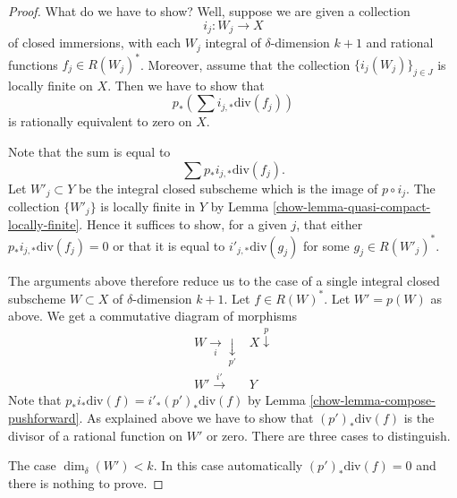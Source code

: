 \begin{proof}

What do we have to show? Well, suppose we are given a collection
$$
i_j : W_j \longrightarrow X
$$
of closed immersions, with each $W_j$ integral of $\delta$-dimension $k + 1$
and rational functions $f_j \in R(W_j)^*$.
Moreover, assume that
the collection $\{i_j(W_j)\}_{j \in J}$ is locally finite on $X$.
Then we have to show that
$$
p_*\left(\sum i_{j, *}\text{div}(f_j)\right)
$$
is rationally equivalent to zero on $X$.

\medskip\noindent
Note that the sum is equal to
$$
\sum p_*i_{j, *}\text{div}(f_j).
$$
Let $W'_j \subset Y$ be the integral closed subscheme which is the
image of $p \circ i_j$. The collection $\{W'_j\}$ is locally finite
in $Y$ by Lemma \ref{chow-lemma-quasi-compact-locally-finite}.
Hence it suffices to show, for a given $j$, that either
$p_*i_{j, *}\text{div}(f_j) = 0$ or that it
is equal to $i'_{j, *}\text{div}(g_j)$ for some $g_j \in R(W'_j)^*$.

\medskip\noindent
The arguments above therefore reduce us to the case of a single
integral closed subscheme $W \subset X$ of $\delta$-dimension $k + 1$.
Let $f \in R(W)^*$. Let $W' = p(W)$ as above.
We get a commutative diagram of morphisms
$$
\begin{array}{cc}W \underset{i}{\longrightarrow}\underset{p'}{\downarrow} & X \overset{p}{\downarrow} \\ W' \overset{i'}{\longrightarrow} & Y\end{array}
$$
Note that $p_*i_*\text{div}(f) = i'_*(p')_*\text{div}(f)$ by
Lemma \ref{chow-lemma-compose-pushforward}. As explained above
we have to show that $(p')_*\text{div}(f)$
is the divisor of a rational function on $W'$ or zero.
There are three cases to distinguish.

\medskip\noindent
The case $\dim_\delta(W') < k$. In this case automatically
$(p')_*\text{div}(f) = 0$ and there is nothing to prove.


\end{proof}
